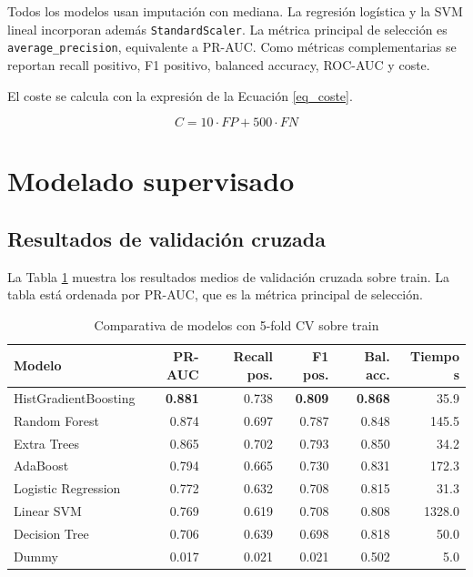 \documentclass[11pt,a4paper]{article}
\begin{document}
Todos los modelos usan imputación con mediana. La regresión logística y la SVM lineal incorporan además \texttt{StandardScaler}. La métrica principal de selección es \texttt{average\_precision}, equivalente a PR-AUC. Como métricas complementarias se reportan recall positivo, F1 positivo, balanced accuracy, ROC-AUC y coste.

El coste se calcula con la expresión de la Ecuación \ref{eq_coste}.

\begin{equation}
\label{eq_coste}
C = 10 \cdot FP + 500 \cdot FN
\end{equation}

\section{Modelado supervisado}
\label{sec_modelado}

\subsection{Resultados de validación cruzada}

La Tabla \ref{tab_cv} muestra los resultados medios de validación cruzada sobre train. La tabla está ordenada por PR-AUC, que es la métrica principal de selección.

\begin{table}[H]
\centering
\caption{Comparativa de modelos con 5-fold CV sobre train}
\label{tab_cv}
\small
\begin{tabular}{@{}lrrrrr@{}}
\toprule
\textbf{Modelo} & \textbf{PR-AUC} & \textbf{Recall pos.} & \textbf{F1 pos.} & \textbf{Bal. acc.} & \textbf{Tiempo s}\\
\midrule
\rowcolor{bestrow} HistGradientBoosting & \textbf{0.881} & 0.738 & \textbf{0.809} & \textbf{0.868} & 35.9\\
Random Forest & 0.874 & 0.697 & 0.787 & 0.848 & 145.5\\
Extra Trees & 0.865 & 0.702 & 0.793 & 0.850 & 34.2\\
AdaBoost & 0.794 & 0.665 & 0.730 & 0.831 & 172.3\\
Logistic Regression & 0.772 & 0.632 & 0.708 & 0.815 & 31.3\\
Linear SVM & 0.769 & 0.619 & 0.708 & 0.808 & 1328.0\\
Decision Tree & 0.706 & 0.639 & 0.698 & 0.818 & 50.0\\
Dummy & 0.017 & 0.021 & 0.021 & 0.502 & 5.0\\
\bottomrule
\end{tabular}
\end{table}
\end{document}
